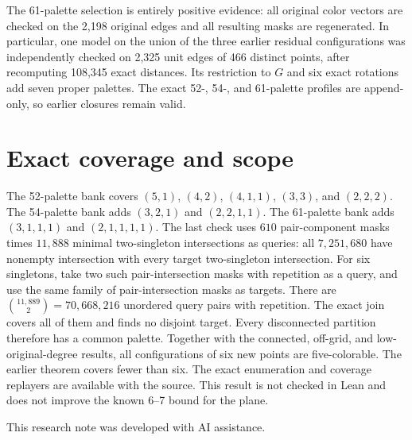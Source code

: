 \documentclass[11pt,letterpaper]{article}
\begin{document}
The 61-palette selection is entirely positive evidence:
all original color vectors are checked on the 2,198 original
edges and all resulting masks are regenerated. In particular,
one model on the union of the three earlier residual
configurations was independently checked on 2,325 unit edges of
466 distinct points, after recomputing 108,345 exact distances.
Its restriction to \(G\) and six exact rotations add seven
proper palettes. The exact 52-, 54-, and 61-palette profiles are
append-only, so earlier closures remain valid.

\section{Exact coverage and scope}
The 52-palette bank covers \((5,1)\), \((4,2)\), \((4,1,1)\), \((3,3)\), and \((2,2,2)\).
The 54-palette bank adds \((3,2,1)\) and \((2,2,1,1)\).
The 61-palette bank adds \((3,1,1,1)\) and \((2,1,1,1,1)\).
The last check uses \(610\) pair-component masks times
\(11{,}888\) minimal two-singleton intersections as queries:
all \(7{,}251{,}680\) have nonempty intersection with every
target two-singleton intersection. For six singletons, take two such
pair-intersection masks with repetition as a query, and use the
same family of pair-intersection masks as targets. There are
\(\binom{11{,}889}{2}=70{,}668{,}216\) unordered query pairs
with repetition. The exact join covers all of them and finds
no disjoint target. Every disconnected partition therefore
has a common palette. Together with the connected, off-grid,
and low-original-degree results, all configurations
of six new points are five-colorable. The earlier theorem covers
fewer than six. The exact enumeration and coverage replayers
are available with the source. This result is not checked in
Lean and does not improve the known 6--7 bound for the plane.

\medskip\noindent
This research note was developed with AI assistance.
\end{document}
